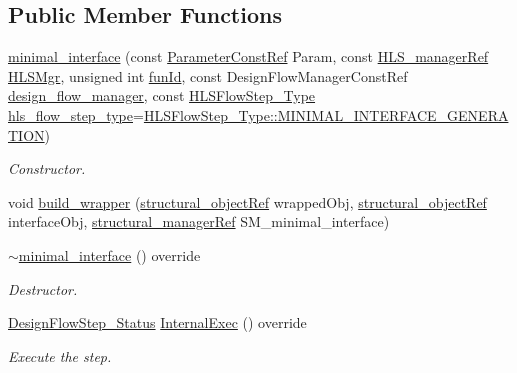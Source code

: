 \subsection*{Public Member Functions}
\begin{DoxyCompactItemize}
\item 
\hyperlink{classminimal__interface_aeceaa0bf5f7b0b4aa1d947d40ff60c77}{minimal\+\_\+interface} (const \hyperlink{Parameter_8hpp_a37841774a6fcb479b597fdf8955eb4ea}{Parameter\+Const\+Ref} Param, const \hyperlink{hls__manager_8hpp_acd3842b8589fe52c08fc0b2fcc813bfe}{H\+L\+S\+\_\+manager\+Ref} \hyperlink{classHLS__step_ade85003a99d34134418451ddc46a18e9}{H\+L\+S\+Mgr}, unsigned int \hyperlink{classHLSFunctionStep_a3e6434fd86c698b0c70520b859bff5b0}{fun\+Id}, const Design\+Flow\+Manager\+Const\+Ref \hyperlink{classDesignFlowStep_ab770677ddf087613add30024e16a5554}{design\+\_\+flow\+\_\+manager}, const \hyperlink{hls__step_8hpp_ada16bc22905016180e26fc7e39537f8d}{H\+L\+S\+Flow\+Step\+\_\+\+Type} \hyperlink{classHLS__step_aefd59af15346ec3f10bf12bd756e6777}{hls\+\_\+flow\+\_\+step\+\_\+type}=\hyperlink{hls__step_8hpp_ada16bc22905016180e26fc7e39537f8da30b267b74a2ad7262c635562e1d191a0}{H\+L\+S\+Flow\+Step\+\_\+\+Type\+::\+M\+I\+N\+I\+M\+A\+L\+\_\+\+I\+N\+T\+E\+R\+F\+A\+C\+E\+\_\+\+G\+E\+N\+E\+R\+A\+T\+I\+ON})
\begin{DoxyCompactList}\small\item\em Constructor. \end{DoxyCompactList}\item 
void \hyperlink{classminimal__interface_adb6448d855a8f541648b22bbffa7993c}{build\+\_\+wrapper} (\hyperlink{structural__objects_8hpp_a8ea5f8cc50ab8f4c31e2751074ff60b2}{structural\+\_\+object\+Ref} wrapped\+Obj, \hyperlink{structural__objects_8hpp_a8ea5f8cc50ab8f4c31e2751074ff60b2}{structural\+\_\+object\+Ref} interface\+Obj, \hyperlink{structural__manager_8hpp_ab3136f0e785d8535f8d252a7b53db5b5}{structural\+\_\+manager\+Ref} S\+M\+\_\+minimal\+\_\+interface)
\item 
\hyperlink{classminimal__interface_a756ca92a61ff2c289ef6c37a5db5adee}{$\sim$minimal\+\_\+interface} () override
\begin{DoxyCompactList}\small\item\em Destructor. \end{DoxyCompactList}\item 
\hyperlink{design__flow__step_8hpp_afb1f0d73069c26076b8d31dbc8ebecdf}{Design\+Flow\+Step\+\_\+\+Status} \hyperlink{classminimal__interface_a38ab4c7e28f6f8c7dd9cd98989b8bddf}{Internal\+Exec} () override
\begin{DoxyCompactList}\small\item\em Execute the step. \end{DoxyCompactList}\end{DoxyCompactItemize}
